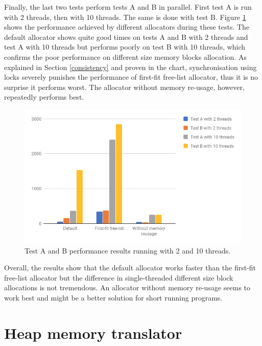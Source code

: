 \documentclass[bsc,frontabs,twoside,singlespacing,parskip,deptreport]{infthesis}     %
\begin{document}
Finally, the last two tests perform tests A and B in parallel. First test A is run with 2 threads, then with 10 threads. The same is done with test B. Figure \ref{teste_f} shows the performance achieved by different allocators during these tests. The default allocator shows quite good times on tests A and B with 2 threads and test A with 10 threads but performs poorly on test B with 10 threads, which confirms the poor performance on different size memory blocks allocation. As explained in Section \ref{consistency} and proven in the chart, synchronisation using locks severely punishes the performance of first-fit free-list allocator, thus it is no surprise it performs worst. The allocator without memory re-usage, however, repeatedly performs best.

\begin{figure}[H]
	\centering
	\includegraphics[width=12cm]{allocator_test_e}
	\caption{Test A and B performance results running with 2 and 10 threads.}
	\label{teste_f}
\end{figure}

Overall, the results show that the default allocator works faster than the first-fit free-list allocator but the difference in single-threaded different size block allocations is not tremendous. An allocator without memory re-usage seems to work best and might be a better solution for short running programs.











\chapter{Heap memory translator}
\label{heap-memory-translator}
\end{document}

